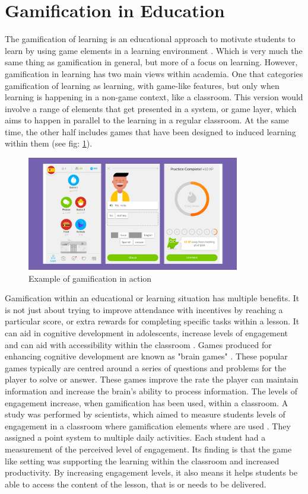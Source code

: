 	\section{Gamification in Education}
		\label{sec:gamification_edu}
		
		The gamification of learning is an educational approach to motivate students to learn by using game elements in a learning environment \cite{gamelearning}. Which is very much the same thing as gamification in general, but more of a focus on learning. However, gamification in learning has two main views within academia. One that categories gamification of learning as learning, with game-like features, but only when learning is happening in a non-game context, like a classroom. This version would involve a range of elements that get presented in a system, or game layer, which aims to happen in parallel to the learning in a regular classroom. At the same time, the other half includes games that have been designed to induced learning within them \cite{gamelearning} (see fig: \ref{fig:badges}).
		
		\begin{figure}[t]
			\centering
			\includegraphics[height=5cm]{gamification2}
			\caption{Example of gamification in action \cite{edugamexample}}
			\label{fig:badges}
		\end{figure}
		
		Gamification within an educational or learning situation has multiple benefits. It is not just about trying to improve attendance with incentives by reaching a particular score, or extra rewards for completing specific tasks within a lesson. It can aid in cognitive development in adolescents, increase levels of engagement and can aid with accessibility within the classroom \cite{5benefits}. Games produced for enhancing cognitive development are known as "brain games" \cite{5benefits}. These popular games typically are centred around a series of questions and problems for the player to solve or answer. These games improve the rate the player can maintain information and increase the brain's ability to process information. The levels of engagement increase, when gamification has been used, within a classroom. A study was performed by scientists, which aimed to measure students levels of engagement in a classroom where gamification elements where are used \cite{eduengage}. They assigned a point system to multiple daily activities. Each student had a measurement of the perceived level of engagement. Its finding is that the game like setting was supporting the learning within the classroom and increased productivity. By increasing engagement levels, it also means it helps students be able to access the content of the lesson, that is or needs to be delivered. 
		
